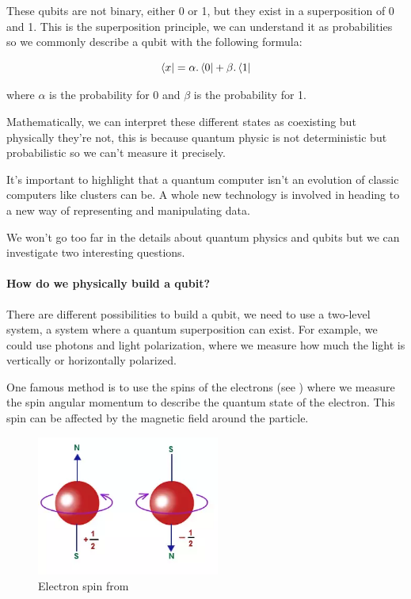 These qubits are not binary, either 0 or 1, but they exist in a superposition of 0 and 1. This is the superposition principle, we can understand it as probabilities so we commonly describe a qubit with the following formula: \newline

\begin{equation}
  \bra{x} = \alpha . \bra{0} + \beta . \bra{1}
\end{equation}
\medskip

where $\alpha$ is the probability for 0 and $\beta$ is the probability for 1. \newline

Mathematically, we can interpret these different states as coexisting but physically they're not, this is because quantum physic is not deterministic but probabilistic so we can't measure it precisely. \newline

It's important to highlight that a quantum computer isn't an evolution of classic computers like clusters can be. A whole new technology is involved in heading to a new way of representing and manipulating data. \newline

We won't go too far in the details about quantum physics and qubits but we can investigate two interesting questions. \newline

\paragraph{How do we physically build a qubit?}

There are different possibilities to build a qubit, we need to use a two-level system, a system where a quantum superposition can exist. For example, we could use photons and light polarization, where we measure how much the light is vertically or horizontally polarized. \newline

One famous method is to use the spins of the electrons (see \cite{spinWiki}) where we measure the spin angular momentum to describe the quantum state of the electron. This spin can be affected by the magnetic field around the particle. \newline

\begin{figure}[ht]
\centering
\includegraphics[width=6cm]{Figures/electronSpin}
\caption{Electron spin from \cite{spinNumber}}
\end{figure}
\medskip

